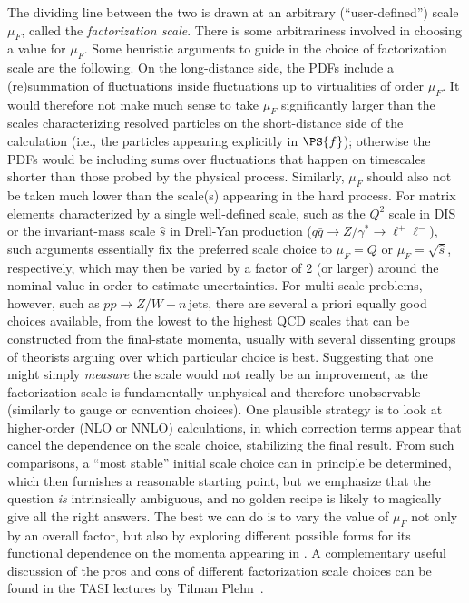 %
The dividing line between
the two is drawn at an arbitrary (``user-defined'') scale $\mu_F$,
called the \emph{factorization scale}. 
There is some arbitrariness involved in choosing a value for
$\mu_F$. Some heuristic arguments to guide in the choice of factorization
scale are the following. On the
long-distance side, the PDFs include a (re)summation of fluctuations
inside fluctuations up to virtualities of order $\mu_F$. 
It would therefore not make much sense to take $\mu_F$ 
significantly larger than the scales characterizing resolved particles
on the short-distance side of the calculation (i.e., the particles
appearing explicitly in $\PS{f}$); 
otherwise the PDFs would be including sums over fluctuations that happen
on timescales shorter than those probed by the physical
process. Similarly, $\mu_F$ should also not be taken much lower than the
scale(s) appearing in the hard process. 
For matrix elements characterized by a single well-defined scale,
such as the $Q^2$ scale in DIS or the
invariant-mass scale $\hat{s}$ in Drell-Yan production
($q\bar{q}\to Z/\gamma^*\to \ell^+\ell^-$), such arguments essentially
fix the preferred scale choice to $\mu_F=Q$ or $\mu_F=\sqrt{\hat{s}}$,
respectively, which may then be varied by a factor
of 2 (or larger) around the nominal value in order to estimate
uncertainties. For multi-scale problems, however, such as $pp\to
Z/W+n\,$jets, there are several a priori equally good choices
available, from the lowest to the highest QCD scales that can be
constructed from the final-state momenta, usually with several
dissenting groups of theorists arguing over which particular choice is
best. Suggesting that one might simply \emph{measure} the scale
would not really be an improvement, as the factorization
scale is fundamentally unphysical and therefore
unobservable (similarly to gauge or convention choices). 
%
One plausible strategy is to
look at higher-order (NLO or NNLO) calculations, in which correction
terms appear that cancel the dependence on the scale choice, stabilizing the final
result. From such comparisons, a
``most stable'' initial scale choice can in principle be determined,
which then furnishes a 
reasonable starting point, but we  emphasize that the
question \emph{is} intrinsically ambiguous, and no golden recipe
is likely to magically give all the right answers. The best we can do is
to vary the value of $\mu_F$ not only by an overall factor, but also by
exploring different possible forms for its 
functional dependence on the momenta appearing in
. A complementary useful discussion of the pros and cons of different
factorization scale choices can be found in the TASI lectures by
Tilman Plehn~\cite{Plehn:2008zs}. 

